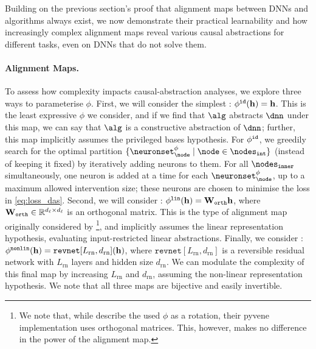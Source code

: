 \documentclass{article}
\newcommand{\R}{\mathbb{R}}
\newcommand{\nodesinner}{\nodes_{\mathtt{inner}}}
\newcommand{\layer}{\ell}
\newcommand{\hiddenstates}{\mathbf{h}}
\newcommand{\nlayers}{L}
\newcommand{\dimension}{d}
\newcommand{\causalmap}{\phi}
\begin{document}
Building on the previous section's proof that alignment maps between DNNs and algorithms always exist, we now demonstrate their practical learnability and how increasingly complex alignment maps reveal various causal abstractions for different tasks, even on DNNs that do not solve them.

\newcommand{\IIA}{\mathtt{IIA}}
\newcommand{\revnetfunc}{\mathtt{revnet}}
\newcommand{\revnetlayers}{\nlayers_{\mathrm{rn}}}
\newcommand{\revnetdim}{\dimension_{\mathrm{rn}}}
\newcommand{\nonlinearname}{non-linear\xspace}

\paragraph{Alignment Maps.}
To assess how 
 complexity impacts causal-abstraction analyses, we explore three ways to parameterise $\causalmap$.
First, we will consider the simplest : $\causalmapidentity(\hiddenstates) = \hiddenstates$.
This is the least expressive $\causalmap$ we consider, and if we find that $\alg$ abstracts $\dnn$ under this map, we can say that $\alg$ is a constructive abstraction of $\dnn$; further, this map implicitly assumes the privileged bases hypothesis.
For $\causalmapidentity$, we greedily search for the optimal partition $\{\neuronset^\causalmap_\node \mid \node \in \nodesint\}$ (instead of keeping it fixed) by iteratively adding neurons to them. 
For all $\nodesinner$ simultaneously, one neuron is added at a time for each $\neuronset^\causalmap_\node$, up to a maximum allowed intervention size; these neurons are chosen to minimise the loss in \cref{eq:loss_das}.
Second, we will consider : $\Rotation(\hiddenstates) = \orthogonalmatrix\hiddenstates$, where $\orthogonalmatrix \in \R^{\dimension_{\layer} \times \dimension_{\layer}}$ is an orthogonal matrix.
This is the type of alignment map originally considered by \citet{Geiger2023FindingAB}\footnote{We note that, while \citet{Geiger2023FindingAB} describe the used $\causalmap$ as a rotation, their pyvene \citep{wu-etal-2024-pyvene} implementation uses orthogonal matrices. This, however, makes no difference in the power of the alignment map.}, and implicitly assumes the linear representation hypothesis, evaluating input-restricted linear abstractions.
Finally, we consider \defn{\nonlinearname maps}:
$\RevNet(\hiddenstates) = \revnetfunc[\revnetlayers, \revnetdim](\hiddenstates)$, where $\revnetfunc[\revnetlayers, \revnetdim]$ is a reversible residual network \citep[RevNet;][]{Gomez2017TheRR} with $\revnetlayers$ layers and hidden size $\revnetdim$.
We can modulate the complexity of this final map by increasing $\revnetlayers$ and $\revnetdim$, assuming the non-linear representation hypothesis.
We note that all three maps are bijective and easily invertible.
\end{document}
